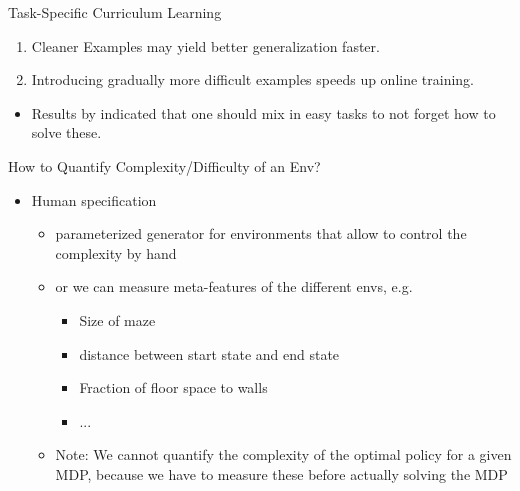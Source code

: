 \begin{frame}[c]{Task-Specific Curriculum Learning~}
	
	
	\begin{enumerate}
		\item Cleaner Examples may yield better generalization faster.
		\item Introducing gradually more difficult examples speeds up online training.
	\end{enumerate}

	\begin{itemize}
		\item Results by  indicated that one should mix in easy tasks to not forget how to solve these.
	\end{itemize}

	
\end{frame}
\begin{frame}[c]{How to Quantify Complexity/Difficulty of an Env?}
	
	\begin{itemize}
		\item Human specification
		\begin{itemize}
			\item parameterized generator for environments that allow to control the complexity by hand
			\item or we can measure meta-features of the different envs, e.g.
			\begin{itemize}
				\item Size of maze
				\item distance between start state and end state
				\item Fraction of floor space to walls
				\item ...
			\end{itemize}
			\item Note: We cannot quantify the complexity of the optimal policy for a given MDP, because we have to measure these before actually solving the MDP
		\end{itemize}
	\end{itemize}
	

\end{frame}
